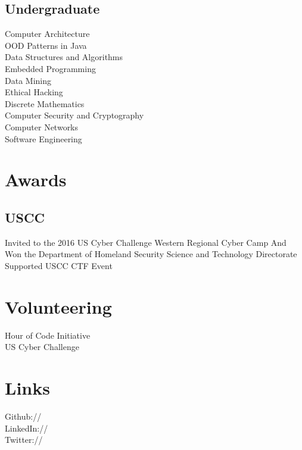 \documentclass[]{deedy-resume-openfont}
\begin{document}
\begin{minipage}[t]{0.25\textwidth}
\subsection{Undergraduate}

Computer Architecture \\
OOD Patterns in Java\\
Data Structures and Algorithms \\
Embedded Programming \\
Data Mining \\
Ethical Hacking \\
Discrete Mathematics \\
Computer Security and Cryptography \\
Computer Networks \\
Software Engineering \\
\sectionsep


\section{Awards}
\subsection{USCC}
Invited to the 2016 US Cyber Challenge Western Regional Cyber Camp And\\
Won the Department of Homeland Security Science and Technology Directorate Supported USCC CTF Event \\
\sectionsep


\section{Volunteering}
Hour of Code Initiative \\
US Cyber Challenge \\
\sectionsep


\section{Links} 
Github:// \href{https://github.com/btcrs}{} \\
LinkedIn://  \href{https://www.linkedin.com/in/btcrs}{} \\
Twitter://  \href{https://twitter.com/btcrs}{} \\
\sectionsep


%
%

\end{minipage} 
\end{document}
